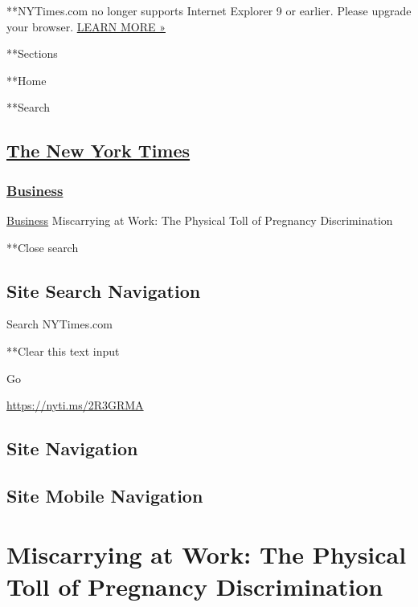  **NYTimes.com no longer supports Internet Explorer 9 or earlier. Please
upgrade your browser.
\href{http://www.nytimes3xbfgragh.onion/content/help/site/ie9-support.html}{LEARN
MORE »}

**Sections

**Home

**Search

\hypertarget{the-new-york-times}{%
\subsection{\texorpdfstring{\href{http://www.nytimes3xbfgragh.onion/}{The
New York Times}}{The New York Times}}\label{the-new-york-times}}

\hypertarget{-business-}{%
\subsubsection{\texorpdfstring{ \href{/section/business}{Business}
}{ Business }}\label{-business-}}

 \href{/section/business}{Business} \textbar{}Miscarrying at Work: The
Physical Toll of Pregnancy Discrimination

**Close search

\hypertarget{site-search-navigation}{%
\subsection{Site Search Navigation}\label{site-search-navigation}}

Search NYTimes.com

**Clear this text input

Go

\url{https://nyti.ms/2R3GRMA}

\hypertarget{site-navigation}{%
\subsection{Site Navigation}\label{site-navigation}}

\hypertarget{site-mobile-navigation}{%
\subsection{Site Mobile Navigation}\label{site-mobile-navigation}}

\hypertarget{miscarrying-at-work-the-physical-toll-of-pregnancy-discrimination}{%
\section{Miscarrying at Work: The Physical Toll of Pregnancy
Discrimination}\label{miscarrying-at-work-the-physical-toll-of-pregnancy-discrimination}}

